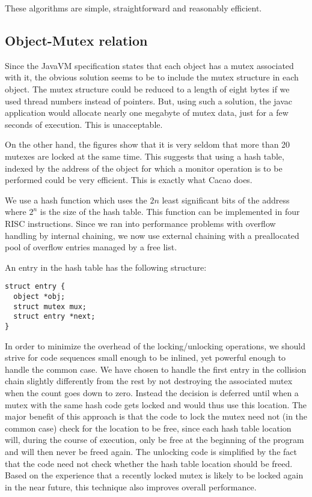 These algorithms are simple, straightforward and reasonably efficient.


\subsection{Object-Mutex relation}
\label{objectmutex}

Since the JavaVM specification states that each object has a mutex
associated with it, the obvious solution seems to be to include the
mutex structure in each object. The mutex structure could be reduced
to a length of eight bytes if we used thread numbers instead of
pointers. But, using such a solution, the javac application would
allocate nearly one megabyte of mutex data, just for a few seconds of
execution. This is unacceptable.

On the other hand, the figures show that it is very seldom that more
than 20 mutexes are locked at the same time. This suggests that using
a hash table, indexed by the address of the object for which a monitor
operation is to be performed could be very efficient. This is exactly
what Cacao does.

We use a hash function which uses the $2 n$ least significant bits of
the address where $2^n$ is the size of the hash table. This function
can be implemented in four RISC instructions. Since we ran into
performance problems with overflow handling by internal chaining, we
now use external chaining with a preallocated pool of overflow entries
managed by a free list.

An entry in the hash table has the following structure:

\begin{verbatim}
struct entry {
  object *obj;
  struct mutex mux;
  struct entry *next;
}
\end{verbatim}

In order to minimize the overhead of the locking/unlocking operations,
we should strive for code sequences small enough to be inlined, yet
powerful enough to handle the common case.  We have chosen to handle
the first entry in the collision chain slightly differently from the
rest by not destroying the associated mutex when the count goes down
to zero. Instead the decision is deferred until when a mutex with the
same hash code gets locked and would thus use this location.  The
major benefit of this approach is that the code to lock the mutex need
not (in the common case) check for the location to be free, since each
hash table location will, during the course of execution, only be free
at the beginning of the program and will then never be freed again.
The unlocking code is simplified by the fact that the code need not
check whether the hash table location should be freed.  Based on the
experience that a recently locked mutex is likely to be locked again
in the near future, this technique also improves overall performance.

